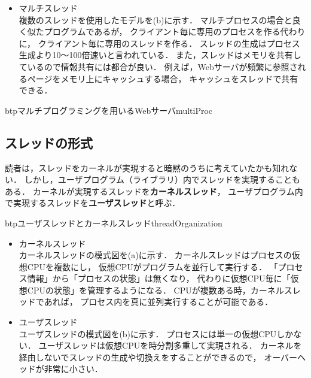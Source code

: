 \begin{itemize}
\item マルチスレッド \\
複数のスレッドを使用したモデルを(b)に示す．
マルチプロセスの場合と良く似たプログラムであるが，
クライアント毎に専用のプロセスを作る代わりに，
クライアント毎に専用のスレッドを作る．
スレッドの生成はプロセス生成より10〜100倍速いと言われている\cite{lightWeight}．
また，スレッドはメモリを共有しているので情報共有には都合が良い．
例えば，Webサーバが頻繁に参照されるページをメモリ上にキャッシュする場合，
キャッシュをスレッドで共有できる．
\end{itemize}

\begin{myfig}{btp}{マルチプログラミングを用いるWebサーバ}{multiProc}
~~~~
\end{myfig}

\subsection{スレッドの形式}
読者は，スレッドをカーネルが実現すると暗黙のうちに考えていたかも知れない．
しかし，ユーザプログラム（ライブラリ）内でスレッドを実現することもある．
カーネルが実現するスレッドを{\bf カーネルスレッド}，
ユーザプログラム内で実現するスレッドを{\bf ユーザスレッド}と呼ぶ．

\begin{myfig}{btp}{ユーザスレッドとカーネルスレッド}{threadOrganization}
~~~~
\end{myfig}

\begin{itemize}
\item カーネルスレッド \\
カーネルスレッドの模式図を(a)に示す．
カーネルスレッドはプロセスの仮想CPUを複数にし，
仮想CPUがプログラムを並行して実行する．
「プロセス情報」から「プロセスの状態」は無くなり，
代わりに仮想CPU毎に「仮想CPUの状態」を管理するようになる．
CPUが複数ある時，カーネルスレッドであれば，
プロセス内を真に並列実行することが可能である．

\item ユーザスレッド \\
ユーザスレッドの模式図を(b)に示す．
プロセスには単一の仮想CPUしかない．
ユーザスレッドは仮想CPUを時分割多重して実現される．
カーネルを経由しないでスレッドの生成や切換えをすることができるので，
オーバーヘッドが非常に小さい．
\end{itemize}


